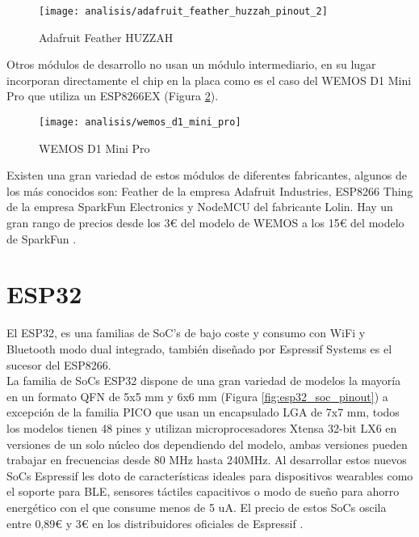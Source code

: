 \documentclass[../proyecto.tex]{subfiles}
\begin{document}
\begin{figure}[H]
\centering
\texttt{[image: analisis/adafruit\_feather\_huzzah\_pinout\_2]}
\caption{Adafruit Feather HUZZAH}
\label{fig:adafruit_feather_huzzah_pinout_2}
\end{figure}

Otros módulos de desarrollo no usan un módulo intermediario, en su lugar incorporan directamente el chip en la placa como es el caso del WEMOS D1 Mini Pro \cite{wemos_d1_mini_pro} que utiliza un ESP8266EX (Figura \ref{fig:wemos_d1_mini_pro}).\\

\begin{figure}[h]
\centering
\texttt{[image: analisis/wemos\_d1\_mini\_pro]}
\caption{WEMOS D1 Mini Pro}
\label{fig:wemos_d1_mini_pro}
\end{figure}

Existen una gran variedad de estos módulos de diferentes fabricantes, algunos de los más conocidos son:  Feather de la empresa Adafruit Industries, ESP8266 Thing de la empresa SparkFun Electronics y NodeMCU del fabricante Lolin. Hay un gran rango de precios desde los 3€ del modelo de WEMOS a los 15€ del modelo de SparkFun \cite{espressif_provider_digikey} \cite{espressif_provider_mouser}\cite{sparkfun_thing_official_page}.\\


\section{ESP32}
El ESP32, es una familias de SoC's de bajo coste y consumo con WiFi y Bluetooth modo dual integrado, también diseñado por Espressif Systems \cite{esp32_overview} es el sucesor del ESP8266.\\

La familia de SoCs ESP32 dispone de una gran variedad de modelos la mayoría en un formato QFN de 5x5 mm y 6x6 mm (Figura \ref{fig:esp32_soc_pinout}) a excepción de la familia PICO que usan un encapsulado LGA de 7x7 mm, todos los modelos tienen 48 pines y utilizan microprocesadores Xtensa 32-bit LX6 en versiones de un solo núcleo dos dependiendo del modelo, ambas versiones pueden trabajar en frecuencias desde 80 MHz hasta 240MHz. Al desarrollar estos nuevos SoCs Espressif les doto de características ideales para dispositivos wearables como el soporte para BLE, sensores táctiles capacitivos o modo de sueño para ahorro energético con el que consume menos de 5  uA. El precio de estos SoCs oscila entre 0,89€ y 3€ en los distribuidores oficiales de Espressif \cite{espressif_provider_digikey} \cite{espressif_provider_mouser}.\\
\end{document}
